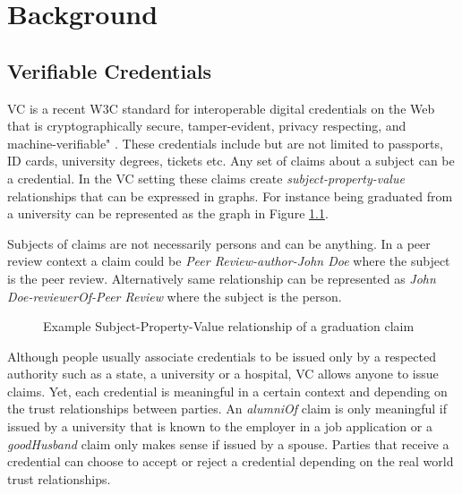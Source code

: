 
\chapter{Background}\label{chapter:background}

\section{Verifiable Credentials}

\acrfull{VC} is a recent \acrshort{W3C} standard for interoperable digital credentials on the Web that is cryptographically secure, tamper-evident, privacy respecting, and machine-verifiable" \parencite{Sporny.18Kas2019}. These credentials include but are not limited to passports, ID cards, university degrees, tickets etc. Any set of claims about a subject can be a credential. In the \acrshort{VC} setting these claims create \textit{subject-property-value} relationships that can be expressed in graphs. For instance being graduated from a university can be represented as the graph in Figure \ref{fig:alumniOf}. 

Subjects of claims are not necessarily persons and can be anything. In a peer review context a claim could be \textit{Peer Review-author-John Doe} where the subject is the peer review. Alternatively same relationship can be represented as \textit{John Doe-reviewerOf-Peer Review} where the subject is the person.

\begin{figure}[htbp]
  \centering
  
  \caption{Example Subject-Property-Value relationship of a graduation claim \parencite{Sporny.18Kas2019}} \label{fig:alumniOf}
\end{figure}

Although people usually associate credentials to be issued only by a respected authority such as a state, a university or a hospital, \acrlong{VC} allows anyone to issue claims. Yet, each credential is meaningful in a certain context and depending on the trust relationships between parties. An \textit{alumniOf} claim is only meaningful if issued by a university that is known to the employer in a job application or a \textit{goodHusband} claim only makes sense if issued by a spouse. Parties that receive a credential can choose to accept or reject a credential depending on the real world trust relationships.

